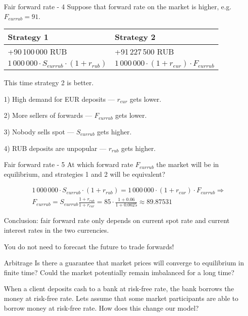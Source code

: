 \documentclass{beamer}
\begin{document}
\begin{frame}{Fair forward rate - 4}
\justify
Suppose that forward rate on the market is higher, e.g. $F_{eurrub}=91$.


\justify
\centering
\begin{tabular}{l|l}
Strategy 1 & Strategy 2 \\ \hline
+90\,100\,000 RUB  & +91\,227\,500 RUB \\
$1\,000\,000 \cdot S_{eurrub} \cdot (1+r_{rub})$ & $1\,000\,000 \cdot (1+r_{eur}) \cdot F_{eurrub}$
\end{tabular}

\justify
This time strategy 2 is better. 

1) High demand for EUR deposits --- $r_{eur}$ gets lower.

2) More sellers of forwards --- $F_{eurrub}$ gets lower.

3) Nobody sells spot --- $S_{eurrub}$ gets higher. 

4) RUB deposits are unpopular --- $r_{rub}$ gets higher.
\end{frame}



\begin{frame}{Fair forward rate - 5}
\justify
At which forward rate $F_{eurrub}$ the market will be in equilibrium, and strategies 1 and 2 will be equivalent?

\begin{align*}
&1\,000\,000 \cdot S_{eurrub} \cdot (1 + r_{rub}) = 1\,000\,000 \cdot (1+r_{eur}) \cdot F_{eurrub} \Rightarrow \\
&F_{eurrub} = S_{eurrub} \frac{1 + r_{rub}}{1 + r_{eur}} = 85 \cdot \frac{1 + 0.06}{1 + 0.0025} \approx 89.87531
\end{align*}

\justify
Conclusion: fair forward rate only depends on current spot rate and current interest rates in the two currencies.

\justify
You do not need to forecast the future to trade forwards!
\end{frame}



\begin{frame}{Arbitrage}
\justify
Is there a guarantee that market prices will converge to equilibrium in finite time? Could the market potentially remain imbalanced for a long time?

\justify
When a client deposits cash to a bank at risk-free rate, the bank borrows the money at risk-free rate. Lets assume that some market participants are able to borrow money at risk-free rate. How does this change our model?
\end{frame}
\end{document}
